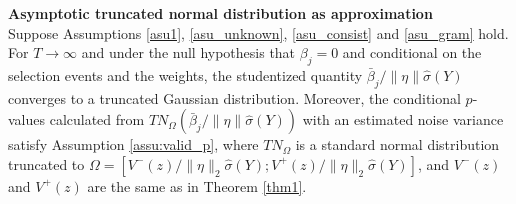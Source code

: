 \documentclass[11pt]{article}
\def\cmt#1{{\textcolor{red}{(#1)}}}
\begin{document}
\begin{theorem_app}{\bf Asymptotic truncated normal distribution as approximation}\label{col2}\\
	Suppose Assumptions \ref{asu1}, \ref{asu_unknown}, \ref{asu_consist} and \ref{asu_gram} hold. For $T \rightarrow \infty$ and under the null hypothesis that $\beta_j=0$ and conditional on the selection events and the weights, the studentized quantity $\bar{\beta}_j/\|\eta\|\hat{\sigma}(Y)$ converges to a truncated Gaussian distribution. Moreover, the conditional $p$-values calculated from $TN_{\Omega}(\bar{\beta}_j/\|\eta\|\hat{\sigma}(Y))$ with an estimated noise variance satisfy Assumption \ref{assu:valid_p}, where $TN_{\Omega}$ is a standard normal distribution truncated to  $\Omega=[{V}^-(z)/\|\eta\|_2\hat{\sigma}(Y);{V}^+(z)/\|\eta\|_2\hat{\sigma}(Y)]$, and ${V}^{-}(z)$ and ${V}^{+}(z)$ are the same as in Theorem \ref{thm1}.
	\end{theorem_app}




\end{document}
